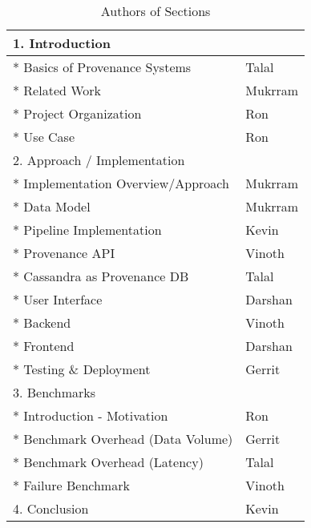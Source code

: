 \begin{table}
\begin{center}
 \begin{tabular}{| m{18em} m{10em} |} 
 \hline
1. Introduction                                                   &                    \\
 \hline
* Basics of Provenance Systems                                    &     Talal               \\
 \hline
* Related Work                                                    &          Mukrram          \\
 \hline
* Project Organization                                            &         Ron           \\
 \hline
* Use Case                                                        &   Ron                 \\
 \hline
2. Approach / Implementation                                      &                    \\
 \hline
* Implementation Overview/Approach                                &    Mukrram                \\
 \hline
* Data Model                                                      &        Mukrram            \\
 \hline
* Pipeline Implementation                                         &      Kevin              \\
 \hline
* Provenance API                                                     &         Vinoth           \\
 \hline
* Cassandra as Provenance DB                                      &       Talal             \\
 \hline
* User Interface                                                  &           Darshan         \\
 \hline
* Backend                                                         &         Vinoth           \\
 \hline
* Frontend                                                        &    Darshan                \\
 \hline
* Testing \& Deployment  &  Gerrit         \\
 \hline
3. Benchmarks                                                     &                    \\
 \hline
* Introduction - Motivation                                             & Ron \\
 \hline
* Benchmark Overhead (Data Volume)      & Gerrit \\  
 \hline
* Benchmark Overhead (Latency)      & Talal \\  
 \hline
* Failure Benchmark                                             &       Vinoth     \\
 \hline
4. Conclusion                                                     &     Kevin               \\
 \hline
\end{tabular}
\end{center}
\caption{Authors of Sections}
\label{table:authors}
\end{table}


